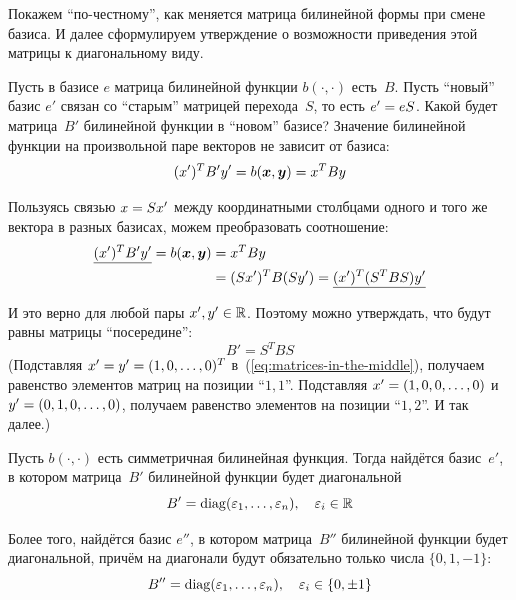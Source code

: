 \documentclass[a4paper,12pt]{article}
\begin{document}
  Покажем ``по-честному'', как меняется матрица билинейной формы при смене базиса.
  И далее сформулируем утверждение о возможности приведения этой матрицы к диагональному виду.

  Пусть в базисе $e$ матрица билинейной функции $b(\cdot, \cdot)$ есть~$B$.
  Пусть ``новый'' базис $e'$ связан со ``старым'' матрицей перехода~$S$, то есть $e' \hm= eS$.
  Какой будет матрица~$B'$ билинейной функции в ``новом'' базисе?
  Значение билинейной функции на произвольной паре векторов не зависит от базиса:
  \[
    (x')^T B' y' = b(\boldsymbol x, \boldsymbol y) = x^T B y
  \]

  Пользуясь связью $x \hm= Sx'$ между координатными столбцами одного и того же вектора в разных базисах, можем преобразовать соотношение:
  \begin{equation}\label{eq:matrices-in-the-middle}
  \begin{split}
    \underline{(x')^T B' y'} = b(\boldsymbol x, \boldsymbol y) &= x^T B y\\
    &= (Sx')^T B (Sy') = \underline{(x')^T (S^T B S) y'}
  \end{split}
  \end{equation}

  И это верно для любой пары $x', y' \hm\in \RR$.
  Поэтому можно утверждать, что будут равны матрицы ``посередине'':
  \begin{equation}\label{eq:matrix-change}
    \boxed{B' = S^T B S}
  \end{equation}
  (Подставляя $x' \hm= y' \hm= (1, 0, \ldots, 0)^T$ в~(\ref{eq:matrices-in-the-middle}), получаем равенство элементов матриц на позиции ``$1,1$''.
  Подставляя $x' \hm= (1, 0, 0, \ldots, 0)$ и $y' \hm= (0, 1, 0, \ldots, 0)$, получаем равенство элементов на позиции ``$1,2$''.
  И так далее.)

  \begin{theorem}
    Пусть $b(\cdot, \cdot)$ есть симметричная билинейная функция.
    Тогда найдётся базис~$e'$, в котором матрица~$B'$ билинейной функции будет диагональной
    \[
      B' = \operatorname{diag}(\varepsilon_1, \ldots, \varepsilon_n),\quad \varepsilon_i \in \operatorname{\mathbb R}
    \]
    
    Более того, найдётся базис $e''$, в котором матрица~$B''$ билинейной функции будет диагональной, причём на диагонали будут обязательно только числа $\{0, 1, -1\}$:
    \begin{equation}\label{eq:canonical-matrix}
      B'' = \operatorname{diag}(\varepsilon_1, \ldots, \varepsilon_n),\quad \varepsilon_i \in \{0, \pm 1\}
    \end{equation}
  \end{theorem}
  
\end{document}
